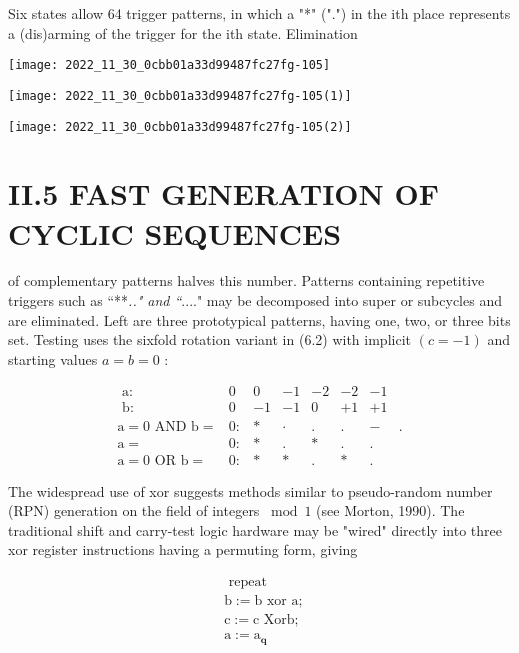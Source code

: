 \begin{CJK}{UTF8}{gbsn}
Six states allow 64 trigger patterns, in which a "*" (".") in the ith place represents a (dis)arming of the trigger for the ith state. Elimination

\begin{center}
\texttt{[image: 2022\_11\_30\_0cbb01a33d99487fc27fg-105]}
\end{center}

\begin{center}
\texttt{[image: 2022\_11\_30\_0cbb01a33d99487fc27fg-105(1)]}
\end{center}

\begin{center}
\texttt{[image: 2022\_11\_30\_0cbb01a33d99487fc27fg-105(2)]}
\end{center}

\section{II.5 FAST GENERATION OF CYCLIC SEQUENCES}
of complementary patterns halves this number. Patterns containing repetitive triggers such as “**\textit{.." and “}...." may be decomposed into super or subcycles and are eliminated. Left are three prototypical patterns, having one, two, or three bits set. Testing uses the sixfold rotation variant in (6.2) with implicit $(c=-1)$ and starting values $a=b=0$ :

$$
\begin{array}{rlrrrrrr}
\text { a: } & 0 & 0 & -1 & -2 & -2 & -1 \\
\text { b: } & 0 & -1 & -1 & 0 & +1 & +1 \\
\mathrm{a}=0 \text { AND b}= & 0: & * & \cdot & . & . & - & . \\
\mathrm{a}= & 0: & * & . & * & . & . \\
\mathrm{a}=0 \text { OR } \mathrm{b}= & 0: & * & * & . & * & .
\end{array}
$$

The widespread use of xor suggests methods similar to pseudo-random number (RPN) generation on the field of integers $\bmod 1$ (see Morton, 1990). The traditional shift and carry-test logic hardware may be "wired" directly into three xor register instructions having a permuting form, giving

$$
\begin{aligned}
& \text { repeat } \\
& \mathrm{b}:=\mathrm{b} \text { xor } \mathrm{a} \text {; } \\
& \mathrm{c}:=\mathrm{c} \text { Xorb; } \\
& \mathrm{a}:=\mathrm{a}_{\mathbf{q}} 
\end{aligned}
$$


\end{CJK}
